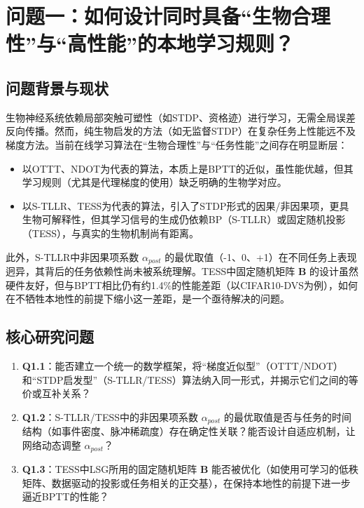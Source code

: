 \documentclass{article}
\begin{document}
\section{问题一：如何设计同时具备“生物合理性”与“高性能”的本地学习规则？}

\subsection{问题背景与现状}

生物神经系统依赖局部突触可塑性（如STDP、资格迹）进行学习，无需全局误差反向传播。然而，纯生物启发的方法（如无监督STDP）在复杂任务上性能远不及梯度方法。当前在线学习算法在“生物合理性”与“任务性能”之间存在明显断层：

\begin{itemize}
    \item 以OTTT、NDOT为代表的算法，本质上是BPTT的近似，虽性能优越，但其学习规则（尤其是代理梯度的使用）缺乏明确的生物学对应。
    \item 以S-TLLR、TESS为代表的算法，引入了STDP形式的因果/非因果项，更具生物可解释性，但其学习信号的生成仍依赖BP（S-TLLR）或固定随机投影（TESS），与真实的生物机制尚有距离。
\end{itemize}

此外，S-TLLR中非因果项系数 \(\alpha_{post}\) 的最优取值（-1、0、+1）在不同任务上表现迥异，其背后的任务依赖性尚未被系统理解。TESS中固定随机矩阵 \(\mathbf{B}\) 的设计虽然硬件友好，但与BPTT相比仍有约1.4\%的性能差距（以CIFAR10-DVS为例），如何在不牺牲本地性的前提下缩小这一差距，是一个亟待解决的问题。

\subsection{核心研究问题}

\begin{enumerate}
    \item \textbf{Q1.1}：能否建立一个统一的数学框架，将“梯度近似型”（OTTT/NDOT）和“STDP启发型”（S-TLLR/TESS）算法纳入同一形式，并揭示它们之间的等价或互补关系？
    \item \textbf{Q1.2}：S-TLLR/TESS中的非因果项系数 \(\alpha_{post}\) 的最优取值是否与任务的时间结构（如事件密度、脉冲稀疏度）存在确定性关联？能否设计自适应机制，让网络动态调整 \(\alpha_{post}\)？
    \item \textbf{Q1.3}：TESS中LSG所用的固定随机矩阵 \(\mathbf{B}\) 能否被优化（如使用可学习的低秩矩阵、数据驱动的投影或任务相关的正交基），在保持本地性的前提下进一步逼近BPTT的性能？
\end{enumerate}
\end{document}
